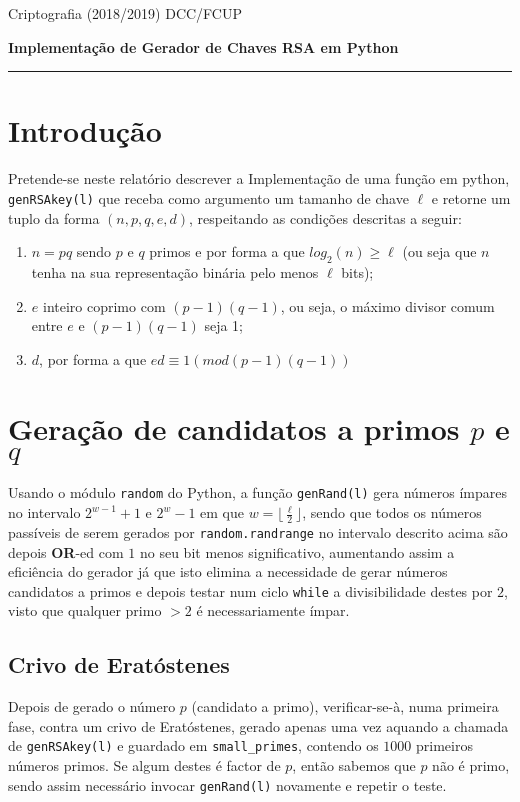\documentclass[dvipsnames]{article}
\begin{document}
Criptografia (2018/2019)
\hfill DCC/FCUP

\begin{center}\LARGE\bf 
  Implementação de Gerador de Chaves RSA em Python \\
\end{center}

\vskip 0.4cm
\hrule
\vskip 0.4cm

\section{Introdução}
Pretende-se neste relatório descrever a Implementação de uma função em python, \texttt{genRSAkey(l)} que receba como argumento um tamanho de chave $\ell$ e retorne um tuplo da forma $(n,p,q,e,d)$, respeitando as condições descritas a seguir:
\begin{enumerate}
  \item $n=pq$ sendo $p$ e $q$ primos e por forma a que $log_2(n) \geq \ell$ (ou seja que $n$ tenha na sua representação binária pelo menos $\ell$ bits);
  \item $e$ inteiro coprimo com $(p-1)(q-1)$, ou seja, o máximo divisor comum entre $e$ e $(p-1)(q-1)$ seja 1;
  \item $d$, por forma a que $ed \equiv 1 (mod (p-1)(q-1))$
\end{enumerate}

\section{Geração de candidatos a primos $p$ e $q$}
Usando o módulo \texttt{random} do Python, a função \texttt{genRand(l)} gera números ímpares no intervalo $2^{w-1} + 1$ e $2^{w} - 1$ em que $w=\lfloor \frac{\ell}{2} \rfloor$, sendo que todos os números passíveis de serem gerados por \texttt{random.randrange} no intervalo descrito acima são depois \textbf{OR}-ed com $1$ no seu bit menos significativo, aumentando assim a eficiência do gerador já que isto elimina a necessidade de gerar números candidatos a primos e depois testar num ciclo \texttt{while} a divisibilidade destes por $2$, visto que qualquer primo $>2$ é necessariamente ímpar.

\vskip 0.4cm

\subsection{Crivo de Eratóstenes}

Depois de gerado o número $p$ (candidato a primo), verificar-se-à, numa primeira fase, contra um crivo de Eratóstenes, gerado apenas uma vez aquando a chamada de \texttt{genRSAkey(l)} e guardado em \texttt{small\_primes}, contendo os $1000$ primeiros números primos. Se algum destes é factor de $p$, então sabemos que $p$ não é primo, sendo assim necessário invocar \texttt{genRand(l)} novamente e repetir o teste.
\end{document}
